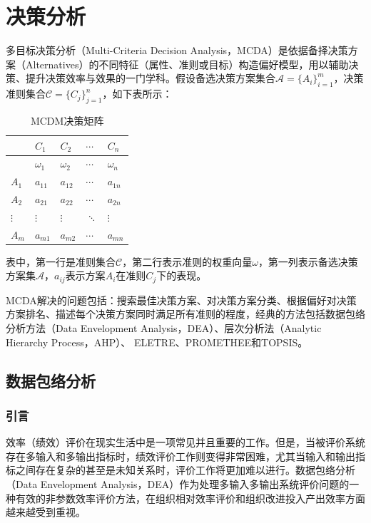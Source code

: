 \part{决策分析}
多目标决策分析（Multi-Criteria Decision Analysis，MCDA）是依据备择决策方案（Alternatives）的不同特征（属性、准则或目标）构造偏好模型，用以辅助决策、提升决策效率与效果的一门学科。假设备选决策方案集合$\mathcal{A}=\{A_i\}_{i=1}^m$，决策准则集合$\mathcal{C} = \{C_j\}_{j=1}^n$，如下表所示：
\begin{table}[ht]
\caption{MCDM决策矩阵}\label{tbl:decisionmatrix}
\centering
\begin{tabular}{l|llll}
  \hline
   & $C_1$ & $C_2$ & $\cdots$ & $C_n$\\
  \hline
   & $\omega_1$ & $\omega_2$ & $\cdots$ & $\omega_n$\\
  \hline
  $A_1$ & $a_{11}$ & $a_{12}$ & $\cdots$ & $a_{1n}$ \\
  $A_2$ & $a_{21}$ & $a_{22}$ & $\cdots$ & $a_{2n}$ \\
  $\vdots$ & $\vdots$ & $\vdots$ & $\ddots$ & $\vdots$ \\
  $A_m$ & $a_{m1}$ & $a_{m2}$ & $\cdots$ & $a_{mn}$ \\
  \hline
\end{tabular}
\end{table}
表中，第一行是准则集合$\mathcal{C}$，第二行表示准则的权重向量$\omega$，第一列表示备选决策方案集$\mathcal{A}$，$a_{ij}$表示方案$A_i$在准则$C_j$下的表现。

MCDA解决的问题包括：搜索最佳决策方案、对决策方案分类、根据偏好对决策方案排名、描述每个决策方案同时满足所有准则的程度，经典的方法包括数据包络分析方法（Data Envelopment Analysis，DEA）、层次分析法（Analytic Hierarchy Process，AHP）\cite{saaty1977scaling,saaty1980analytic}、
ELETRE\cite{roy1968classement}、PROMETHEE和TOPSIS。

\chapter{数据包络分析}

\ornamento
\section{引言}
效率（绩效）评价在现实生活中是一项常见并且重要的工作。但是，当被评价系统存在多输入和多输出指标时，绩效评价工作则变得非常困难，尤其当输入和输出指标之间存在复杂的甚至是未知关系时，评价工作将更加难以进行。数据包络分析（Data Envelopment Analysis，DEA）作为处理多输入多输出系统评价问题的一种有效的非参数效率评价方法，在组织相对效率评价和组织改进投入产出效率方面越来越受到重视。

